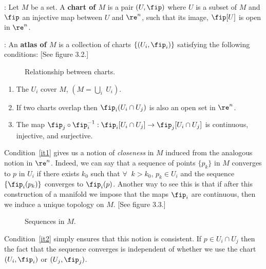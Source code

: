 : Let $M$ be a set. A {\bf chart of $M$} is a pair $(U,\fip)$ where $U$ is a subset of $M$ and $\fip$ an injective map between $U$ and $\re^n$, such that its image, $\fip[U]$ is open in $\re^n$.

: An {\bf atlas of $M$} is a collection of charts $\{(U_i,\fip_i)\}$ satisfying the following conditions: 
 [See figure 3.2.]

\espa 
\begin{figure}[htbp]
  \begin{center}
    \caption{Relationship between charts.}
    \label{fig:3_2}
  \end{center}
\end{figure}

\begin{enumerate}
 \item The $U_i$ cover $M$, $\displaystyle(M=\bigcup_i\;U_i)$.
 \label{it1}
 \item If two charts overlap then $\fip_i(U_i\cap U_j)$ is also an open set in $\re^n$.\label{it2}
 \item The map $\fip_j \circ \fip_i^{-1}:\fip_i[U_i\cap U_j] \to \fip_j[U_i\cap U_j] $ is continuous, injective, and surjective.
\label{it3}
\end{enumerate}

Condition~\ref{it1} gives us a notion of {\it closeness} in $M$ induced from the analogous notion in $\re^n$. Indeed, we can say that a sequence of points $\{p_k\}$ in $M$ converges to $p$ in $U_i$ if there exists $k_0$ such that $\forall\;\;k> k_0$, $p_k\in U_i$ and the sequence $\{\fip_i(p_k)\}$ converges to $\fip_i(p)$. 
Another way to see this is that if after this construction of a manifold we impose that the maps $\fip_i$ are continuous, then we induce a unique topology on $M$.
[See figure 3.3.] 

\espa 
\begin{figure}[htbp]
  \begin{center}
    \caption{Sequences in $M$.}
    \label{fig:3_3}
  \end{center}
\end{figure}

Condition~\ref{it2} simply ensures that this notion is consistent. If $p\in U_i\cap U_j$ then the fact that the sequence converges is independent of whether we use the chart $(U_i,\fip_i)$ or $(U_j,\fip_j)$.

